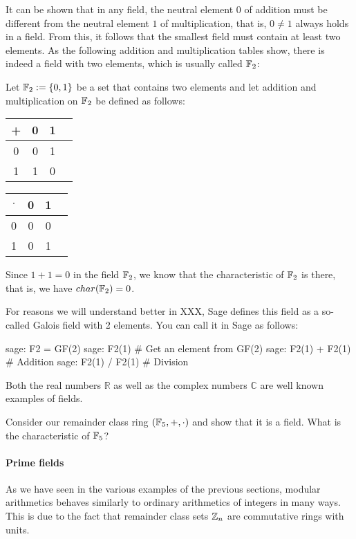 \begin{example}\label{ex:field-2-elements} It can be shown that in any field, the neutral element $0$ of addition must be different from the neutral element $1$ of multiplication, that is, $0\neq 1$ always holds in a field. From this, it follows that the smallest field must contain at least two elements. As the following addition and multiplication tables show, there is indeed a field with two elements, which is usually called $\mathbb{F}_2$:

Let $\mathbb{F}_2:=\{0,1 \}$ be a set that contains two elements and let addition and multiplication on $\mathbb{F}_2$ be defined as follows:
\begin{center}
  \begin{tabular}{c | c c c}
    + & 0 & 1 \\\hline
    0 & 0 & 1\\
    1 & 1 & 0 \\
  \end{tabular} \quad \quad \quad \quad
  \begin{tabular}{c | c c c}
$\cdot$ & 0 & 1 \\\hline
      0 & 0 & 0 \\
      1 & 0 & 1 \\
  \end{tabular}
\end{center}
Since $1+1=0$ in the field $\mathbb{F}_2$, we know that the characteristic of $\mathbb{F}_2$ is there, that is, we have $char(\mathbb{F}_2)=0$.

For reasons we will understand better in XXX, Sage defines this field as a so-called Galois field with 2 elements. You can call it in Sage as follows:
\begin{sagecommandline}
sage: F2 = GF(2)
sage: F2(1) # Get an element from GF(2)
sage: F2(1) + F2(1) # Addition
sage: F2(1) / F2(1) # Division
\end{sagecommandline}
\end{example}
\begin{example}
Both the real numbers $\mathbb{R}$ as well as the complex numbers $\mathbb{C}$ are well known examples of fields.
\end{example}
\begin{exercise}
Consider our remainder class ring $(\mathbb{F}_5,+,\cdot)$ and show that it is a field. What is the characteristic of $\mathbb{F}_5$?
\end{exercise}
\paragraph{Prime fields}
As we have seen in the various examples of the previous sections, modular arithmetics behaves similarly to ordinary arithmetics of integers  in many ways. This is due to the fact that remainder class sets $\mathbb{Z}_n$ are commutative rings with units.

